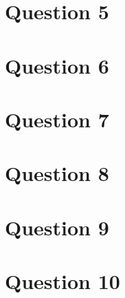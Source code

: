 \documentclass[12pt]{article}
\begin{document}
\section*{Question 5}

\section*{Question 6}

\section*{Question 7}

\section*{Question 8}

\section*{Question 9}

\section*{Question 10}
\end{document}
